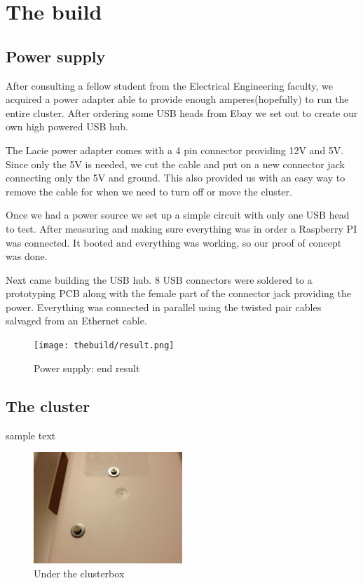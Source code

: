 \clearpage
\section{The build}
\label{sec:build}

\subsection{Power supply}
After consulting a fellow student from the Electrical Engineering faculty, we acquired a power adapter able to provide enough amperes(hopefully) to run the entire cluster. After ordering some USB heads from Ebay we set out to create our own high powered USB hub. 

The Lacie power adapter comes with a 4 pin connector providing 12V and 5V. Since only the 5V is needed, we cut the cable and put on a new connector jack connecting only the 5V and ground. This also provided us with an easy way to remove the cable for when we need to turn off or move the cluster. 

Once we had a power source we set up a simple circuit with only one USB head to test. After measuring and making sure everything was in order a Raspberry PI was connected. It booted and everything was working, so our proof of concept was done.  

Next came building the USB hub. 8 USB connectors were soldered to a prototyping PCB along with the female part of the connector jack providing the power. Everything was connected in parallel using the twisted pair cables salvaged from an Ethernet cable.  

\begin{figure}[h]
	\centering
    \texttt{[image: thebuild/result.png]}
    \caption{Power supply: end result}
    \label{fig:build_power_supply}
\end{figure}

\subsection{The cluster}
sample text

\begin{figure}[h]
	\centering
    \includegraphics[width=0.5\textwidth]{thebuild/cluster_under.jpg}
    \caption{Under the clusterbox}
    \label{fig:build_cluster_under}
\end{figure}

